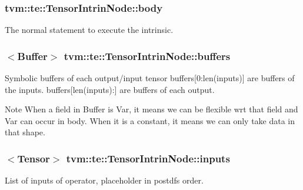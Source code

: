 \subsubsection[{\texorpdfstring{body}{body}}]{ tvm\+::te\+::\+Tensor\+Intrin\+Node\+::body}\hypertarget{classtvm_1_1te_1_1TensorIntrinNode_a9f90aba58e51d525a56f7be4fbcf79e3}{}\label{classtvm_1_1te_1_1TensorIntrinNode_a9f90aba58e51d525a56f7be4fbcf79e3}


The normal statement to execute the intrinsic. 

\subsubsection[{\texorpdfstring{buffers}{buffers}}]{$<${\bf Buffer}$>$ tvm\+::te\+::\+Tensor\+Intrin\+Node\+::buffers}\hypertarget{classtvm_1_1te_1_1TensorIntrinNode_a373d9c4dde9e8b6fb7038ebf65ecb8ea}{}\label{classtvm_1_1te_1_1TensorIntrinNode_a373d9c4dde9e8b6fb7038ebf65ecb8ea}


Symbolic buffers of each output/input tensor buffers\mbox{[}0\+:len(inputs)\mbox{]} are buffers of the inputs. buffers\mbox{[}len(inputs)\+:\mbox{]} are buffers of each output. 

\begin{DoxyNote}{Note}
When a field in Buffer is Var, it means we can be flexible wrt that field and Var can occur in body. When it is a constant, it means we can only take data in that shape. 
\end{DoxyNote}
\subsubsection[{\texorpdfstring{inputs}{inputs}}]{$<${\bf Tensor}$>$ tvm\+::te\+::\+Tensor\+Intrin\+Node\+::inputs}\hypertarget{classtvm_1_1te_1_1TensorIntrinNode_ac28183d6ba30b33f76185b37d031559f}{}\label{classtvm_1_1te_1_1TensorIntrinNode_ac28183d6ba30b33f76185b37d031559f}


List of inputs of operator, placeholder in postdfs order. 

